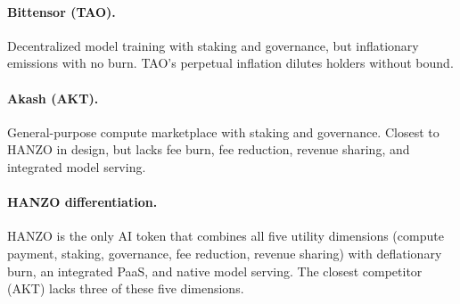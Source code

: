 \paragraph{Bittensor (TAO).} Decentralized model training with staking and
governance, but inflationary emissions with no burn. TAO's perpetual inflation
dilutes holders without bound.

\paragraph{Akash (AKT).} General-purpose compute marketplace with staking and
governance. Closest to HANZO in design, but lacks fee burn, fee reduction,
revenue sharing, and integrated model serving.

\paragraph{HANZO differentiation.} HANZO is the only AI token that combines
all five utility dimensions (compute payment, staking, governance, fee
reduction, revenue sharing) with deflationary burn, an integrated PaaS, and
native model serving. The closest competitor (AKT) lacks three of these five
dimensions.

